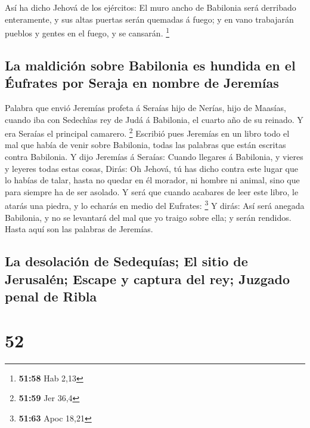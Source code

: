  Así ha dicho Jehová de los ejércitos: El muro ancho de
Babilonia será derribado enteramente, y sus altas puertas serán quemadas
á fuego; y en vano trabajarán pueblos y gentes en el fuego, y se
cansarán. \footnote{\textbf{51:58} Hab 2,13}

\hypertarget{la-maldiciuxf3n-sobre-babilonia-es-hundida-en-el-uxe9ufrates-por-seraja-en-nombre-de-jeremuxedas}{%
\subsection{La maldición sobre Babilonia es hundida en el Éufrates por
Seraja en nombre de
Jeremías}\label{la-maldiciuxf3n-sobre-babilonia-es-hundida-en-el-uxe9ufrates-por-seraja-en-nombre-de-jeremuxedas}}

 Palabra que envió Jeremías profeta á Seraías hijo de
Nerías, hijo de Maasías, cuando iba con Sedechîas rey de Judá á
Babilonia, el cuarto año de su reinado. Y era Seraías el principal
camarero. \footnote{\textbf{51:59} Jer 36,4}  Escribió pues
Jeremías en un libro todo el mal que había de venir sobre Babilonia,
todas las palabras que están escritas contra Babilonia.  Y
dijo Jeremías á Seraías: Cuando llegares á Babilonia, y vieres y leyeres
todas estas cosas,  Dirás: Oh Jehová, tú has dicho contra
este lugar que lo habías de talar, hasta no quedar en él morador, ni
hombre ni animal, sino que para siempre ha de ser asolado. 
Y será que cuando acabares de leer este libro, le atarás una piedra, y
lo echarás en medio del Eufrates: \footnote{\textbf{51:63} Apoc 18,21}
 Y dirás: Así será anegada Babilonia, y no se levantará del
mal que yo traigo sobre ella; y serán rendidos. Hasta aquí son las
palabras de Jeremías.

\hypertarget{la-desolaciuxf3n-de-sedequuxedas-el-sitio-de-jerusaluxe9n-escape-y-captura-del-rey-juzgado-penal-de-ribla}{%
\subsection{La desolación de Sedequías; El sitio de Jerusalén; Escape y
captura del rey; Juzgado penal de
Ribla}\label{la-desolaciuxf3n-de-sedequuxedas-el-sitio-de-jerusaluxe9n-escape-y-captura-del-rey-juzgado-penal-de-ribla}}

\hypertarget{section-51}{%
\section{52}\label{section-51}}

